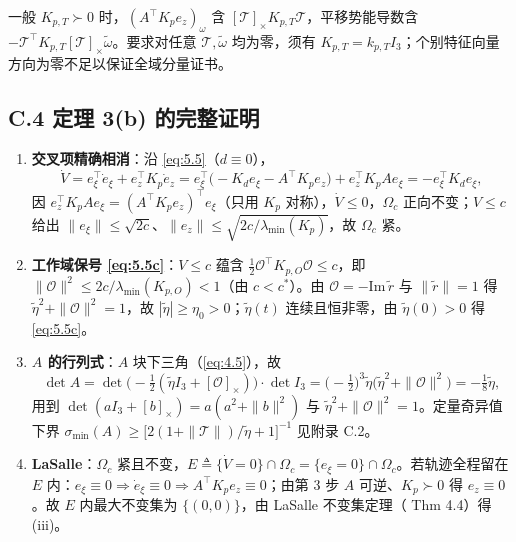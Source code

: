一般 $K_{p,T}\succ0$ 时，$(A^\top K_pe_z)_\omega$ 含 $[\mathcal T]_\times K_{p,T}\mathcal T$，平移势能导数含 $-\mathcal T^\top K_{p,T}[\mathcal T]_\times\tilde\omega$。要求对任意 $\mathcal T,\tilde\omega$ 均为零，须有 $K_{p,T}=k_{p,T}I_3$；个别特征向量方向为零不足以保证全域分量证书。

\subsection*{C.4 定理 3(b) 的完整证明}

\begin{enumerate}[leftmargin=2em]
  \item \textbf{交叉项精确相消}：沿 \eqref{eq:5.5}（$d\equiv0$），
  \begin{equation*}
  \dot V=e_\xi^\top\dot e_\xi+e_z^\top K_p\dot e_z
  =e_\xi^\top\bigl(-K_de_\xi-A^\top K_pe_z\bigr)+e_z^\top K_pAe_\xi
  =-e_\xi^\top K_de_\xi ,
  \end{equation*}
  因 $e_z^\top K_pAe_\xi=(A^\top K_pe_z)^\top e_\xi$（只用 $K_p$ 对称），$\dot V\le0$，$\Omega_c$ 正向不变；$V\le c$ 给出 $\|e_\xi\|\le\sqrt{2c}$、$\|e_z\|\le\sqrt{2c/\lambda_{\min}(K_p)}$，故 $\Omega_c$ 紧。

  \item \textbf{工作域保号 \eqref{eq:5.5c}}：$V\le c$ 蕴含 $\tfrac12\mathcal O^\top K_{p,O}\mathcal O\le c$，即 $\|\mathcal O\|^2\le2c/\lambda_{\min}(K_{p,O})<1$（由 $c<c^*$）。由 $\mathcal O=-\mathrm{Im}\,\tilde r$ 与 $\|\tilde r\|=1$ 得 $\tilde\eta^2+\|\mathcal O\|^2=1$，故 $|\tilde\eta|\ge\eta_0>0$；$\tilde\eta(t)$ 连续且恒非零，由 $\tilde\eta(0)>0$ 得 \eqref{eq:5.5c}。

  \item \textbf{$A$ 的行列式}：$A$ 块下三角（\eqref{eq:4.5}），故
  \begin{equation*}
  \det A=\det\bigl(-\tfrac12(\tilde\eta I_3+[\mathcal O]_\times)\bigr)\cdot\det I_3
  =\bigl(-\tfrac12\bigr)^3\tilde\eta\bigl(\tilde\eta^2+\|\mathcal O\|^2\bigr)=-\tfrac18\tilde\eta ,
  \end{equation*}
  用到 $\det(aI_3+[b]_\times)=a(a^2+\|b\|^2)$ 与 $\tilde\eta^2+\|\mathcal O\|^2=1$。定量奇异值下界 $\sigma_{\min}(A)\ge\bigl[2(1+\|\mathcal T\|)/\tilde\eta+1\bigr]^{-1}$ 见附录 C.2。

  \item \textbf{LaSalle}：$\Omega_c$ 紧且不变，$E\triangleq\{\dot V=0\}\cap\Omega_c=\{e_\xi=0\}\cap\Omega_c$。若轨迹全程留在 $E$ 内：$e_\xi\equiv0\Rightarrow\dot e_\xi\equiv0\Rightarrow A^\top K_pe_z\equiv0$；由第 3 步 $A$ 可逆、$K_p\succ0$ 得 $e_z\equiv0$。故 $E$ 内最大不变集为 $\{(0,0)\}$，由 LaSalle 不变集定理（\cite{Kha02} Thm 4.4）得 (iii)。


\end{enumerate}
